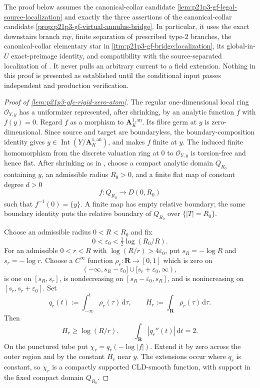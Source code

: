 The proof below assumes the canonical-collar candidate
\cref{lem:p21p3-gf-legal-source-localization} and exactly the three
assertions of the canonical-collar candidate
\cref{prop:p21p3-gf-virtual-annulus-bridge}.  In particular, it uses the
exact downstairs branch ray, finite separation of prescribed type-$2$
branches, the canonical-collar elementary star in
\cref{itm:p21p3-gf-bridge:localization}, its
global-in-\(U\) exact-preimage identity, and compatibility with the
source-separated localization of \cite[Theorem~16.8.5]{CLD25}.  It never
pulls an arbitrary current to a field extension.  Nothing in this proof is
presented as established until the conditional input passes independent and
production verification.

\begin{proof}[Proof of \cref{lem:p21p3-gfc-rigid-zero-atom}]
The regular one-dimensional local ring $\mathcal O_{Y,y}$ has a
uniformizer represented, after shrinking, by an analytic function $f$
with $f(y)=0$.  Regard $f$ as a morphism to
$\mathbf A^{1,\mathrm{an}}_K$.  Its fibre germ at $y$ is
zero-dimensional.  Since source and target are boundaryless, the
boundary-composition identity \cite[(11.4.1.3)]{CLD25} gives
$y\in\operatorname{Int}(Y/\mathbf A^{1,\mathrm{an}}_K)$, and
\cite[Lemma~11.6.5(a)]{CLD25} makes $f$ finite at $y$.  The induced
finite homomorphism from the discrete valuation ring at $0$ to
$\mathcal O_{Y,y}$ is torsion-free and hence flat.  After shrinking as
in \cite[\S11.6.3]{CLD25}, choose a compact analytic domain $Q_{R_0}$
containing $y$, an admissible radius $R_0>0$, and a finite flat map of
constant degree $d>0$
\begin{equation}
\label{eq:p21p3-gfc-finite-rigid-tube}
             f:Q_{R_0}\longrightarrow D(0,R_0)
\end{equation}
such that $f^{-1}(0)=\{y\}$.  A finite map has empty relative boundary;
the same boundary identity puts the relative boundary of $Q_{R_0}$
over $\{|T|=R_0\}$.

Choose an admissible radius $0<R<R_0$ and fix
\[
 0<\varepsilon_0<\tfrac12\log(R_0/R).
\]
For an admissible $0<r<R$ with
$\log(R/r)>4\varepsilon_0$, put $s_R=-\log R$ and
$s_r=-\log r$.  Choose a $C^\infty$ function
$\rho_r:\mathbf R\to[0,1]$ which is zero on
\[
 (-\infty,s_R-\varepsilon_0]\cup[s_r+\varepsilon_0,\infty),
\]
is one on $[s_R,s_r]$, is nondecreasing on
$[s_R-\varepsilon_0,s_R]$, and is nonincreasing on
$[s_r,s_r+\varepsilon_0]$.  Set
\[
 q_r(t):=\int_{-\infty}^{t}\rho_r(\tau)\,\mathrm d\tau,
 \qquad
 H_r:=\int_{\mathbf R}\rho_r(\tau)\,\mathrm d\tau .
\]
Then
\begin{equation}
\label{eq:p21p3-gfc-radial-data}
 H_r\geq\log(R/r),
 \qquad
 \int_{\mathbf R}|q_r''(t)|\,\mathrm dt=2.
\end{equation}
On the punctured tube put
$\chi_r=q_r(-\log|f|)$.  Extend it by zero across the outer region and
by the constant $H_r$ near $y$.  The extensions occur where $q_r$
is constant, so $\chi_r$ is a compactly supported CLD-smooth function,
with support in the fixed compact domain $Q_{R_0}$.


\end{proof}
